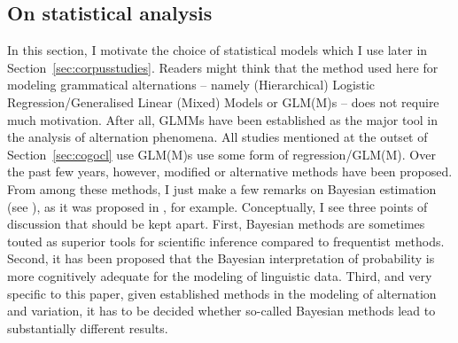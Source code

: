 \documentclass[USenglish]{article}
\begin{document}
\subsection{On statistical analysis}
\label{sec:rightstatistics}

In this section, I motivate the choice of statistical models which I use later in Section~\ref{sec:corpusstudies}.
Readers might think that the method used here for modeling grammatical alternations -- namely (Hierarchical) Logistic Regression\slash Generalised Linear (Mixed) Models or GLM(M)s -- does not require much motivation.
After all, GLMMs have been established as the major tool in the analysis of alternation phenomena.
All studies mentioned at the outset of Section~\ref{sec:cogocl} use GLM(M)s \citep{BresnanEa2007,BresnanHay2010,BresnanFord2010,DivjakArppe2013,Gries2015,NessetJanda2010} use some form of regression\slash GLM(M).
Over the past few years, however, modified or alternative methods have been proposed.
From among these methods, I just make a few remarks on Bayesian estimation (see \citealp{GelmanEa2014}), as it was proposed in \cite{Levshina2016,Divjak2016a}, for example.
Conceptually, I see three points of discussion that should be kept apart.
First, Bayesian methods are sometimes touted as superior tools for scientific inference compared to frequentist methods.
Second, it has been proposed that the Bayesian interpretation of probability is more cognitively adequate for the modeling of linguistic data.
Third, and very specific to this paper, given established methods in the modeling of alternation and variation, it has to be decided whether so-called Bayesian methods lead to substantially different results.
\end{document}
